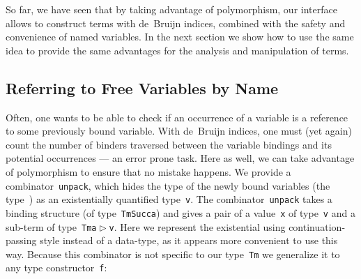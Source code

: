 \documentclass[9pt,authoryear]{sigplanconf}
\begin{document}
%
So far, we have seen that by taking advantage of polymorphism,
    our interface allows to construct terms with de{~}Bruijn indices,
    combined with the safety and convenience of named variables. In the
    next section we show how to use the same idea to provide the same
    advantages for the analysis and manipulation of terms.%


\subsection{Referring to Free Variables by Name}

%
Often, one wants to be able to check if an occurrence of a
    variable is a reference to some previously bound variable. With
    de{~}Bruijn indices, one must (yet again) count the number of
    binders traversed between the variable bindings and its potential
    occurrences --- an error prone task. Here as well, we can take
    advantage of polymorphism to ensure that no mistake happens. We
    provide a combinator{~}\texttt{unpack}, which hides the type of the newly
    bound variables (the type{~}\texttt{\makebox[1.22ex][l]{$ {(} $}}\texttt{\makebox[1.22ex][r]{$ {)} $}}) as an existentially quantified
    type{~}\texttt{v}. The combinator{~}\texttt{unpack} takes a binding structure
    (of type{~}\texttt{Tm}\texttt{\mbox{\hspace{0.50em}}}\texttt{\makebox[1.22ex][l]{$ {(} $}}\texttt{Succ}\texttt{\mbox{\hspace{0.50em}}}\texttt{a}\texttt{\makebox[1.22ex][r]{$ {)} $}}) and gives a pair of a value{~}\texttt{x} of
    type{~}\texttt{v} and a sub-term of type{~}\texttt{Tm}\texttt{\mbox{\hspace{0.50em}}}\texttt{\makebox[1.22ex][l]{$ {(} $}}\texttt{a}\texttt{\mbox{\hspace{0.50em}}}\texttt{$ \vartriangleright $}\texttt{\mbox{\hspace{0.50em}}}\texttt{v}\texttt{\makebox[1.22ex][r]{$ {)} $}}. Here we represent
    the existential using continuation-passing style instead of a
    data-type, as it appears more convenient to use this way. Because
    this combinator is not specific to our type{~}\texttt{Tm} we generalize it
    to any type constructor{~}\texttt{f}{:}%


{\nopagebreak }
\end{document}
